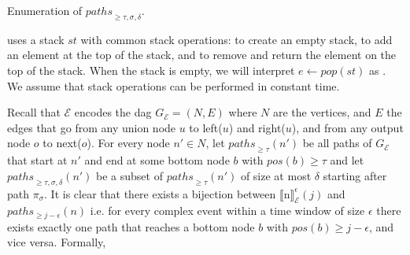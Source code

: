 \begin{algorithm}[H]
  \DontPrintSemicolon
  \SetAlgoNoEnd %
  \SetAlgoNoLine %
\caption{Enumeration of ${paths}_{\ge \tau, \sigma, \delta}$.}
\label{algo:enumeration}
\end{algorithm}

 uses a stack $st$ with common stack operations:  to create an empty stack,  to add an element  at the top of the stack, and  to remove and return the element on the top of the stack. When the stack is empty, we will interpret $e \leftarrow pop(st)$ as . We assume that stack operations can be performed in constant time.

Recall that $\mathcal{E}$ encodes the \acrshort{dag} $G_{\mathcal{E}} = (N, E)$ where $N$ are the vertices, and $E$ the edges that go from any union node $u$ to left($u$) and right($u$), and from any output node $o$ to next($o$). For every node $n' \in N$, let ${paths}_{\ge \tau}(n')$ be all paths of $G_{\mathcal{E}}$ that start at $n'$ and end at some bottom node $b$ with $pos(b) \ge \tau$ and let ${paths}_{\ge \tau, \sigma, \delta}(n')$ be a subset of ${paths}_{\ge \tau}(n')$ of size at most $\delta$ starting after path $\pi_{\sigma}$. It is clear that there exists a bijection between ${\llbracket \text{n} \rrbracket}^{\epsilon}_{\mathcal{E}}(j)$ and $paths_{\ge j - \epsilon}(n)$ i.e. for every complex event within a time window of size $\epsilon$ there exists exactly one path that reaches a bottom node $b$ with $pos(b) \ge j - \epsilon$, and vice versa. Formally,

